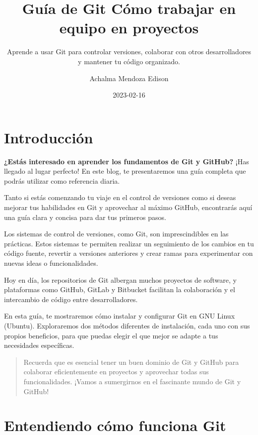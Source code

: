 \documentclass[
  letterpaper,
  DIV=11,
  numbers=noendperiod]{scrartcl}
\title{Guía de Git Cómo trabajar en equipo en proyectos}
\subtitle{Aprende a usar Git para controlar versiones, colaborar con
otros desarrolladores y mantener tu código organizado.}
\author{Achalma Mendoza Edison}
\date{2023-02-16}
\begin{document}
\maketitle
\ifdefined\Shaded\renewenvironment{Shaded}{\begin{tcolorbox}[frame hidden, borderline west={3pt}{0pt}{shadecolor}, boxrule=0pt, sharp corners, interior hidden, enhanced, breakable]}{\end{tcolorbox}}\fi

\hypertarget{introducciuxf3n}{%
\section{Introducción}\label{introducciuxf3n}}

\textbf{¿Estás interesado en aprender los fundamentos de Git y GitHub?}
¡Has llegado al lugar perfecto! En este blog, te presentaremos una guía
completa que podrás utilizar como referencia diaria.

Tanto si estás comenzando tu viaje en el control de versiones como si
deseas mejorar tus habilidades en Git y aprovechar al máximo GitHub,
encontrarás aquí una guía clara y concisa para dar tus primeros pasos.

Los sistemas de control de versiones, como Git, son imprescindibles en
las prácticas. Estos sistemas te permiten realizar un seguimiento de los
cambios en tu código fuente, revertir a versiones anteriores y crear
ramas para experimentar con nuevas ideas o funcionalidades.

Hoy en día, los repositorios de Git albergan muchos proyectos de
software, y plataformas como GitHub, GitLab y Bitbucket facilitan la
colaboración y el intercambio de código entre desarrolladores.

En esta guía, te mostraremos cómo instalar y configurar Git en GNU Linux
(Ubuntu). Exploraremos dos métodos diferentes de instalación, cada uno
con sus propios beneficios, para que puedas elegir el que mejor se
adapte a tus necesidades específicas.

\begin{quote}
Recuerda que es esencial tener un buen dominio de Git y GitHub para
colaborar eficientemente en proyectos y aprovechar todas sus
funcionalidades. ¡Vamos a sumergirnos en el fascinante mundo de Git y
GitHub!
\end{quote}

\hypertarget{entendiendo-cuxf3mo-funciona-git}{%
\section{Entendiendo cómo funciona
Git}\label{entendiendo-cuxf3mo-funciona-git}}
\end{document}
